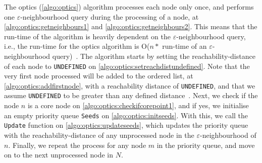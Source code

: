 The \gls{optics} (\autoref{algo:optics}) algorithm processes each node only once, and performs one $\varepsilon$-neighbourhood query during the processing of a node, at \autoref{algo:optics:getneighbours1} and \autoref{algo:optics:getneighbours2}. This means that the run-time of the algorithm is heavily dependent on the $\varepsilon$-neighbourhood query, i.e., the run-time for the \gls{optics} algorithm is O($n * $ run-time of an $\varepsilon$-neighbourhood query)~\cite[p.~53]{Ankerst:1999:OOP:304182.304187}. The algorithm starts by setting the reachability-distance of each node to \texttt{UNDEFINED} on \autoref{algo:optics:setreachdistundefined}. Note that the very first node processed will be added to the ordered list, at \autoref{algo:optics:addfirstnode}, with a reachability distance of \texttt{UNDEFINED}, and that we assume \texttt{UNDEFINED} to be greater than any defined distance~\cite[p.~54]{Ankerst:1999:OOP:304182.304187}. Next, we check if the node $n$ is a core node on \autoref{algo:optics:checkifcorepoint1}, and if yes, we initialise an empty priority queue \texttt{Seeds} on \autoref{algo:optics:initseeds}. With this, we call the \texttt{Update} function on \autoref{algo:optics:updateseeds}, which updates the priority queue with the reachability-distance of any unprocessed node in the $\varepsilon$-neighbourhood of $n$. Finally, we repeat the process for any node $m$ in the priority queue, and move on to the next unprocessed node in $N$.\medbreak

